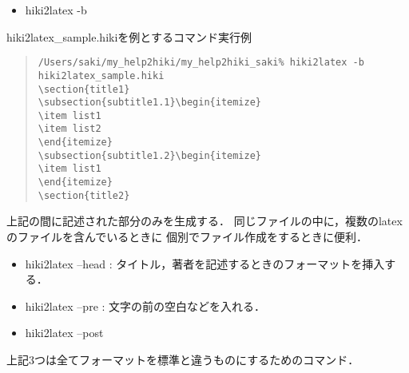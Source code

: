 \begin{itemize}
\item hiki2latex -b
\end{itemize}
\begin{description}
\item hiki2latex\_sample.hikiを例とするコマンド実行例
\end{description}
\begin{quote}\begin{verbatim}
/Users/saki/my_help2hiki/my_help2hiki_saki% hiki2latex -b hiki2latex_sample.hiki
\section{title1}
\subsection{subtitle1.1}\begin{itemize}
\item list1
\item list2
\end{itemize}
\subsection{subtitle1.2}\begin{itemize}
\item list1
\end{itemize}
\section{title2}
\end{verbatim}\end{quote}
\begin{description}
\item 上記の間に記述された部分のみを生成する．
同じファイルの中に，複数のlatexのファイルを含んでいるときに
個別でファイル作成をするときに便利．
\end{description}
\begin{itemize}
\item hiki2latex --head : タイトル，著者を記述するときのフォーマットを挿入する．
\item hiki2latex --pre : 文字の前の空白などを入れる．
\item hiki2latex --post
\end{itemize}
\begin{description}
\item 上記3つは全てフォーマットを標準と違うものにするためのコマンド．
\end{description}